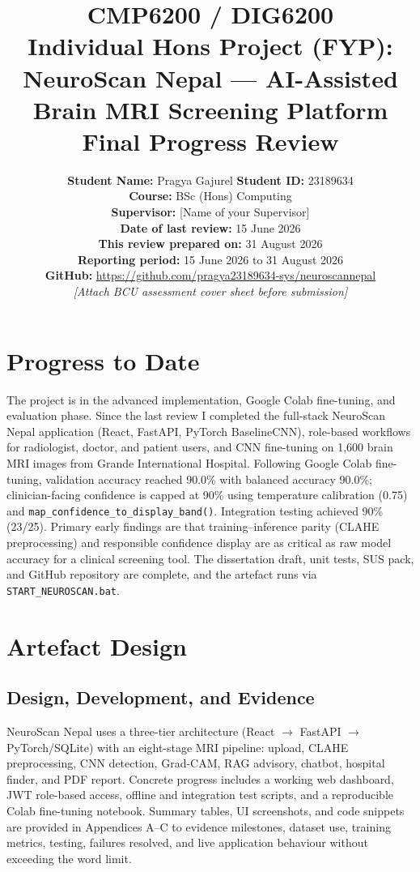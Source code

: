 \documentclass[11pt,a4paper]{article}
\title{\textbf{CMP6200 / DIG6200}\\[0.3em]
Individual Hons Project (FYP): NeuroScan Nepal --- AI-Assisted Brain MRI Screening Platform\\[0.5em]
\large Final Progress Review}
\author{
  \textbf{Student Name:} Pragya Gajurel \quad \textbf{Student ID:} 23189634\\[0.2em]
  \textbf{Course:} BSc (Hons) Computing\\
  \textbf{Supervisor:} [Name of your Supervisor]\\[0.2em]
  \textbf{Date of last review:} 15 June 2026\\
  \textbf{This review prepared on:} 31 August 2026\\
  \textbf{Reporting period:} 15 June 2026 to 31 August 2026\\[0.2em]
  \textbf{GitHub:} \url{https://github.com/pragya23189634-sys/neuroscannepal}\\[0.3em]
  \textit{[Attach BCU assessment cover sheet before submission]}
}
\date{}
\begin{document}
\maketitle
\tableofcontents
\newpage

\section{Progress to Date}

The project is in the advanced implementation, Google Colab fine-tuning, and evaluation phase. Since the last review I completed the full-stack NeuroScan Nepal application (React, FastAPI, PyTorch BaselineCNN), role-based workflows for radiologist, doctor, and patient users, and CNN fine-tuning on 1{,}600 brain MRI images from Grande International Hospital. Following Google Colab fine-tuning, validation accuracy reached 90.0\% with balanced accuracy 90.0\%; clinician-facing confidence is capped at 90\% using temperature calibration (0.75) and \texttt{map\_confidence\_to\_display\_band()}. Integration testing achieved 90\% (23/25). Primary early findings are that training--inference parity (CLAHE preprocessing) and responsible confidence display are as critical as raw model accuracy for a clinical screening tool. The dissertation draft, unit tests, SUS pack, and GitHub repository are complete, and the artefact runs via \texttt{START\_NEUROSCAN.bat}.

\section{Artefact Design}

\subsection{Design, Development, and Evidence}

NeuroScan Nepal uses a three-tier architecture (React $\rightarrow$ FastAPI $\rightarrow$ PyTorch/SQLite) with an eight-stage MRI pipeline: upload, CLAHE preprocessing, CNN detection, Grad-CAM, RAG advisory, chatbot, hospital finder, and PDF report. Concrete progress includes a working web dashboard, JWT role-based access, offline and integration test scripts, and a reproducible Colab fine-tuning notebook. Summary tables, UI screenshots, and code snippets are provided in Appendices A--C to evidence milestones, dataset use, training metrics, testing, failures resolved, and live application behaviour without exceeding the word limit.
\end{document}
